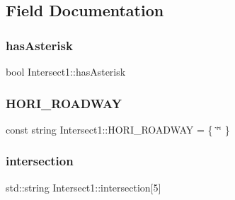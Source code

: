 \subsection{Field Documentation}
\hypertarget{class_intersect1_a4a6b71f9231c83a694bf8df031d0a89c}{}\label{class_intersect1_a4a6b71f9231c83a694bf8df031d0a89c} 
\subsubsection{\texorpdfstring{has\+Asterisk}{hasAsterisk}}
{\footnotesize\ttfamily bool Intersect1\+::has\+Asterisk\hspace{0.3cm}{\ttfamily [private]}}

\hypertarget{class_intersect1_a703d1834f8634e9b4a887ef38bfdc1af}{}\label{class_intersect1_a703d1834f8634e9b4a887ef38bfdc1af} 
\subsubsection{\texorpdfstring{H\+O\+R\+I\+\_\+\+R\+O\+A\+D\+W\+AY}{HORI\_ROADWAY}}
{\footnotesize\ttfamily const string Intersect1\+::\+H\+O\+R\+I\+\_\+\+R\+O\+A\+D\+W\+AY = \{ \char`\"{}\char`\"{} \}\hspace{0.3cm}{\ttfamily [static]}}

\hypertarget{class_intersect1_ae1c091719803a8e8dbc8103d826a7f77}{}\label{class_intersect1_ae1c091719803a8e8dbc8103d826a7f77} 
\subsubsection{\texorpdfstring{intersection}{intersection}}
{\footnotesize\ttfamily std\+::string Intersect1\+::intersection\mbox{[}5\mbox{]}\hspace{0.3cm}{\ttfamily [private]}}

\hypertarget{class_intersect1_a46247452f9c30930e65b46bea25ba7a0}{}\label{class_intersect1_a46247452f9c30930e65b46bea25ba7a0} 
